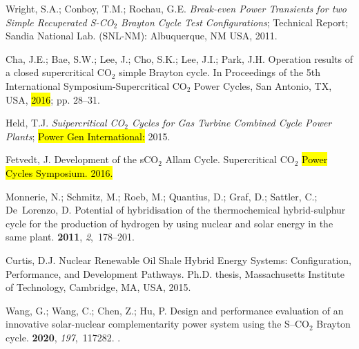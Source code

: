 \documentclass[sustainability,article,accept,moreauthors,pdftex]{Definitions/mdpi}
\begin{document}
\begin{thebibliography}{999}
Wright, S.A.; Conboy, T.M.; Rochau, G.E.
\newblock \emph{Break-even Power Transients for two Simple Recuperated S-CO$_2$ Brayton
  Cycle Test Configurations};
\newblock Technical Report; Sandia National Lab. (SNL-NM): Albuquerque, NM
USA,  2011.

Cha, J.E.; Bae, S.W.; Lee, J.; Cho, S.K.; Lee, J.I.; Park, J.H.
\newblock Operation results of a closed supercritical CO$_2$ simple Brayton cycle.
\newblock In Proceedings of the 5th International Symposium-Supercritical CO$_2$
  Power Cycles, San Antonio, TX, USA, \hl{2016}; pp. 28--31.%

Held, T.J.
\newblock \emph{Suipercritical CO$_2$ Cycles for Gas Turbine Combined Cycle Power
  Plants};
\newblock  \hl{Power Gen International:} %
 2015.

Fetvedt, J.
\newblock Development of the sCO$_2$ Allam Cycle.
\newblock  Supercritical CO$_2$ \hl{Power Cycles Symposium. 2016.}%

Monnerie, N.; Schmitz, M.; Roeb, M.; Quantius, D.; Graf, D.; Sattler, C.;
  De~Lorenzo, D.
\newblock Potential of hybridisation of the thermochemical hybrid-sulphur cycle
  for the production of hydrogen by using nuclear and solar energy in the same
  plant.
 {\bf 2011}, {\em 2},~178--201.

Curtis, D.J.
\newblock Nuclear Renewable Oil Shale Hybrid Energy Systems: Configuration,
  Performance, and Development Pathways.
\newblock Ph.D. thesis, Massachusetts Institute of Technology, Cambridge, MA, USA, 2015.

Wang, G.; Wang, C.; Chen, Z.; Hu, P.
\newblock Design and performance evaluation of an innovative solar-nuclear
  complementarity power system using the S–CO$_2$ Brayton cycle.
 {\bf 2020}, {\em 197},~117282.
\newblock
  {\href{https://doi.org/https://doi.org/10.1016/j.energy.2020.117282}{}}.


\end{thebibliography}
\end{document}
